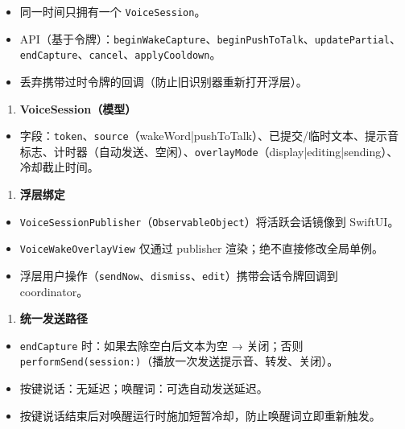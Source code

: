 \begin{itemize}
  \item 同一时间只拥有一个 \texttt{VoiceSession}。
  \item API（基于令牌）：\texttt{beginWakeCapture}、\texttt{beginPushToTalk}、\texttt{updatePartial}、\texttt{endCapture}、\texttt{cancel}、\texttt{applyCooldown}。
  \item 丢弃携带过时令牌的回调（防止旧识别器重新打开浮层）。
\end{itemize}

\begin{enumerate}
  \item \textbf{VoiceSession（模型）}
\end{enumerate}

\begin{itemize}
  \item 字段：\texttt{token}、\texttt{source}（wakeWord|pushToTalk）、已提交/临时文本、提示音标志、计时器（自动发送、空闲）、\texttt{overlayMode}（display|editing|sending）、冷却截止时间。
\end{itemize}

\begin{enumerate}
  \item \textbf{浮层绑定}
\end{enumerate}

\begin{itemize}
  \item \texttt{VoiceSessionPublisher}（\texttt{ObservableObject}）将活跃会话镜像到 SwiftUI。
  \item \texttt{VoiceWakeOverlayView} 仅通过 publisher 渲染；绝不直接修改全局单例。
  \item 浮层用户操作（\texttt{sendNow}、\texttt{dismiss}、\texttt{edit}）携带会话令牌回调到 coordinator。
\end{itemize}

\begin{enumerate}
  \item \textbf{统一发送路径}
\end{enumerate}

\begin{itemize}
  \item \texttt{endCapture} 时：如果去除空白后文本为空 → 关闭；否则 \texttt{performSend(session:)}（播放一次发送提示音、转发、关闭）。
  \item 按键说话：无延迟；唤醒词：可选自动发送延迟。
  \item 按键说话结束后对唤醒运行时施加短暂冷却，防止唤醒词立即重新触发。
\end{itemize}

